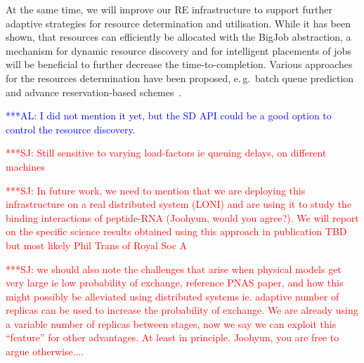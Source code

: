 \documentclass{rspublic}
\newcommand{\alnote}[1]{ {\textcolor{blue} { ***AL: #1 }}}
\newcommand{\jhanote}[1]{ {\textcolor{red} { ***SJ: #1 }}}
\newcommand{\alnote}[1]{}
\newcommand{\jhanote}[1]{}
\begin{document}

At the same time, we will  improve our RE infrastructure to support
further adaptive strategies for resource determination and utilisation.
While it has been shown, that resources can efficiently be allocated with
the BigJob abstraction, a mechanism for dynamic resource discovery and 
for intelligent placements of jobs will be beneficial to further 
decrease the time-to-completion. 
Various approaches for the resources determination have been proposed, e.\,g.\ batch queue 
prediction~\citep{1254939,Chakraborty:2008nx} and advance reservation-based 
schemes~\citep{Jeske:2007wj}. 



\alnote{I did not mention it yet, but the SD API could be a good option to control
the resource discovery.}



\jhanote{Still sensitive to varying load-factors ie queuing delays, 
  on different machines}

\jhanote{In future work, we need to mention that we are deploying this
  infrastructure on a real distributed system (LONI) and are using it
  to study the binding interactions of peptide-RNA (Joohyun, would you
  agree?). We will report on the specific science results obtained
  using this approach in publication TBD but most likely Phil Trans of
  Royal Soc A}

\jhanote{we should also note the challenges that arise when physical
  models get very large ie low probability of exchange, reference PNAS
  paper, and how this might possibly be alleviated using distributed
  systems ie. adaptive number of replicas can be used to increase the
  probability of exchange. We are already using a variable number of
  replicas between stages, now we say we can exploit this ``feature''
  for other advantages. At least in principle.  Joohyun, you are free
  to argue otherwise....}
\end{document}
